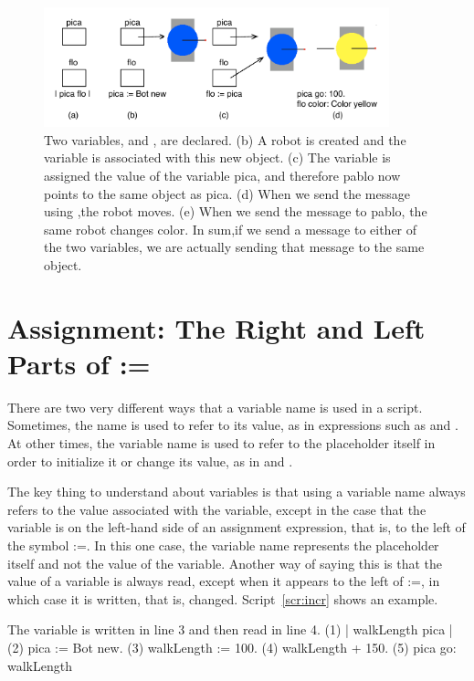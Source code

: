\documentclass[a4paper,10pt,twoside]{book}
\begin{document}
\begin{figure}
\begin{center}
\centerline{\includegraphics[width=10cm]{boxesPointer}}
\caption{Two variables,  and , are declared. (b) A robot is created and the variable 
 is associated with this new object. (c) The variable  is assigned the value of the variable pica, and therefore pablo now points to the same object as pica. (d) When we send the message  using ,the robot moves. (e) When we send the message  to pablo, the same robot changes color. In sum,if we send a message to either of the two variables, we are actually sending that message to the same object. \label{fig:boxesPointerRepresentation}}
\end{center}
\end{figure}

\section*{Assignment: The Right and Left Parts of :=}

There are two very different ways that a variable name is used in a script. Sometimes, the name 
is used to refer to its value, as in expressions such as  and . At other times, the variable name is used to refer to the placeholder itself in order to initialize it or change its value, as in  and . 

The key thing to understand about variables is that using a variable name always refers to 
the value associated with the variable, except in the case that the variable is on the left-hand side of an assignment expression, that is, to the left of the symbol :=. In this one case, the variable name represents the placeholder itself and not the value of the variable. Another way of saying this is that the value of a variable is always read, except when it appears to the left of :=, in which case it is written, that is, changed. Script~\ref{scr:incr} shows an example. 


\begin{script}[incr]{The variable  is written in line 3 and then read in line 4.}
(1)  | walkLength pica | 
(2)  pica := Bot new. 
(3)  walkLength := 100. 
(4)  walkLength + 150. 
(5)  pica go: walkLength
\end{script}
\end{document}
